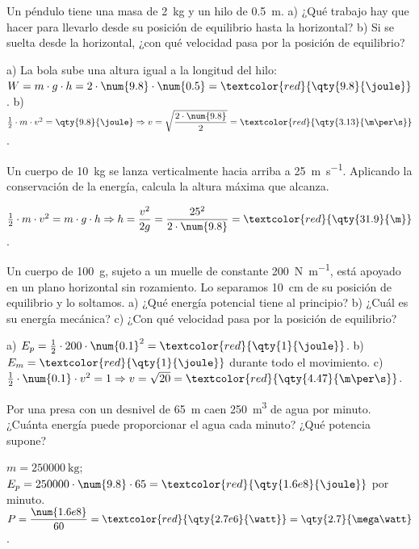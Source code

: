 \begin{exercise}
    Un péndulo tiene una masa de \qty{2}{\kg} y un hilo de \qty{0.5}{\m}. a) ¿Qué trabajo hay que hacer para llevarlo desde su posición de equilibrio hasta la horizontal? b) Si se suelta desde la horizontal, ¿con qué velocidad pasa por la posición de equilibrio?
    \begin{solu}
        a) La bola sube una altura igual a la longitud del hilo: \(W = m \cdot g \cdot h = 2 \cdot \num{9.8} \cdot \num{0.5} = \textcolor{red}{\qty{9.8}{\joule}}\).
        b) \(\frac{1}{2} \cdot m \cdot v^2 = \qty{9.8}{\joule} \Rightarrow v = \sqrt{\dfrac{2 \cdot \num{9.8}}{2}} = \textcolor{red}{\qty{3.13}{\m\per\s}}\).
    \end{solu}
\end{exercise}

\begin{exercise}
    Un cuerpo de \qty{10}{\kg} se lanza verticalmente hacia arriba a \qty{25}{\m\per\s}. Aplicando la conservación de la energía, calcula la altura máxima que alcanza.
    \begin{solu}
        \(\frac{1}{2} \cdot m \cdot v^2 = m \cdot g \cdot h \Rightarrow h = \dfrac{v^2}{2g} = \dfrac{25^2}{2 \cdot \num{9.8}} = \textcolor{red}{\qty{31.9}{\m}}\).
    \end{solu}
\end{exercise}

\begin{exercise}
    Un cuerpo de \qty{100}{\gram}, sujeto a un muelle de constante \qty{200}{\newton\per\m}, está apoyado en un plano horizontal sin rozamiento. Lo separamos \qty{10}{\cm} de su posición de equilibrio y lo soltamos. a) ¿Qué energía potencial tiene al principio? b) ¿Cuál es su energía mecánica? c) ¿Con qué velocidad pasa por la posición de equilibrio?
    \begin{solu}
        a) \(E_p = \frac{1}{2} \cdot 200 \cdot \num{0.1}^2 = \textcolor{red}{\qty{1}{\joule}}\). b) \(E_m = \textcolor{red}{\qty{1}{\joule}}\) durante todo el movimiento.
        c) \(\frac{1}{2} \cdot \num{0.1} \cdot v^2 = 1 \Rightarrow v = \sqrt{20} = \textcolor{red}{\qty{4.47}{\m\per\s}}\).
    \end{solu}
\end{exercise}

\begin{exercise}
    Por una presa con un desnivel de \qty{65}{\m} caen \qty{250}{\cubic\m} de agua por minuto. ¿Cuánta energía puede proporcionar el agua cada minuto? ¿Qué potencia supone?
    \begin{solu}
        \(m = \qty{250000}{\kg}\); \(E_p = 250000 \cdot \num{9.8} \cdot 65 = \textcolor{red}{\qty{1.6e8}{\joule}}\) por minuto.
        \(P = \dfrac{\num{1.6e8}}{60} = \textcolor{red}{\qty{2.7e6}{\watt}} = \qty{2.7}{\mega\watt}\).
    \end{solu}
\end{exercise}

